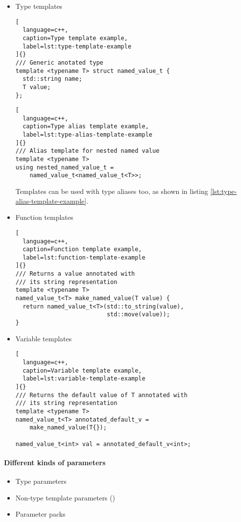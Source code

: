 \documentclass[../main]{subfiles}
\begin{document}
\begin{itemize}
\item Type templates

\begin{lstlisting}[
  language=c++,
  caption=Type template example,
  label=lst:type-template-example
]{}
/// Generic anotated type
template <typename T> struct named_value_t {
  std::string name;
  T value;
};
\end{lstlisting}

\begin{lstlisting}[
  language=c++,
  caption=Type alias template example,
  label=lst:type-alias-template-example
]{}
/// Alias template for nested named value
template <typename T>
using nested_named_value_t =
    named_value_t<named_value_t<T>>;
\end{lstlisting}

Templates can be used with type aliases too, as shown in
listing \ref{lst:type-alias-template-example}.

\item Function templates

\begin{lstlisting}[
  language=c++,
  caption=Function template example,
  label=lst:function-template-example
]{}
/// Returns a value annotated with
/// its string representation
template <typename T>
named_value_t<T> make_named_value(T value) {
  return named_value_t<T>(std::to_string(value),
                          std::move(value));
}
\end{lstlisting}

\item Variable templates

\begin{lstlisting}[
  language=c++,
  caption=Variable template example,
  label=lst:variable-template-example
]{}
/// Returns the default value of T annotated with
/// its string representation
template <typename T>
named_value_t<T> annotated_default_v =
    make_named_value(T{});

named_value_t<int> val = annotated_default_v<int>;
\end{lstlisting}

\end{itemize}

\paragraph{Different kinds of parameters}

\begin{itemize}
\item Type parameters
\item Non-type template parameters (\nttp)
\item Parameter packs
\end{itemize}
\end{document}
